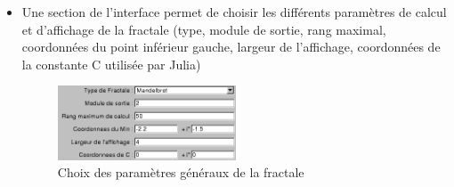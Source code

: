 \documentclass[a4paper,11pt]{article} \usepackage[T1]{fontenc} \usepackage[utf8]{inputenc} \usepackage[francais]{babel}
\begin{document}
\begin{itemize}
  \item Une section de l'interface permet de choisir les différents paramètres de calcul et d'affichage de la fractale (type, module de sortie, rang maximal, coordonnées du point inférieur gauche, largeur de l’affichage, coordonnées de la constante C utilisée par Julia)
        \begin{figure}[H] \begin{center} \includegraphics[width=0.5\textwidth]{Images/Parametres.png}
            \caption{Choix des paramètres généraux de la fractale}
        \end{center} \end{figure}



\end{itemize}
\end{document}
